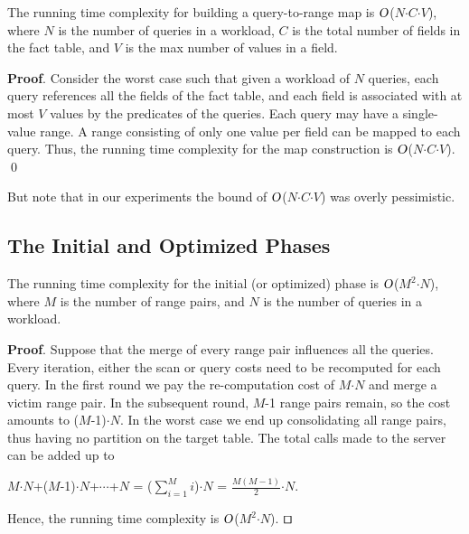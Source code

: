 \documentclass[runningheads]{comsis2}
\def\BigO{\mbox{\sl O}}
\begin{document}
\begin{lemma}
\label{lemma:pre_phase}  
The running time complexity for building a query-to-range map is 
$\BigO$($N${$\cdot$}$C${$\cdot$}$V$), where $N$ is the number of queries 
in a workload, $C$ is the total number of fields in the fact table, 
and $V$ is the max number of values in a field. 
\end{lemma}

{\bf Proof}. Consider the worst case such that given a workload of 
$N$ queries, each query references all the fields of the fact table, and 
each field is associated with at most $V$ values by the predicates of the queries. 
Each query may have a single-value range. 
A range consisting of only one value per field can be mapped to each query. 
Thus, the running time complexity for the map construction 
is $\BigO$($N${$\cdot$}$C${$\cdot$}$V$). \qed

But note that in our experiments the bound of $\BigO$($N${$\cdot$}$C${$\cdot$}$V$) 
was overly pessimistic. 

\subsection{The Initial and Optimized Phases}

\begin{lemma}
\label{lemma:init_phase}  
The running time complexity for the initial (or optimized) phase is 
$\BigO$($M^{2}${$\cdot$}$N$), 
where $M$ is the number of range pairs, and $N$ is the number of queries in a workload. 
\end{lemma}

{\bf Proof}. Suppose that the merge of every range pair influences all the queries. 
Every iteration, either the scan or query costs need to be recomputed for each query. 
In the first round we pay the \hbox{re-computation} cost of $M${$\cdot$}$N$ 
and merge a victim range pair. In the subsequent round, $M$-1 range pairs remain, 
so the cost amounts to ($M$-1){$\cdot$}$N$. 
In the worst case we end up consolidating all range pairs, thus having no partition on 
the target table. The total calls made to the server can be added up to 

\begin{center}
$M${$\cdot$}$N$+($M$-1){$\cdot$}$N$+$\cdots$+$N$ = ($\sum_{i=1}^M i$){$\cdot$}$N$ = $\frac{M(M-1)}{2}${$\cdot$}$N$. 
\end{center}

\noindent Hence, the running time complexity is $\BigO$($M^{2}${$\cdot$}$N$). $\qed$
\end{document}
